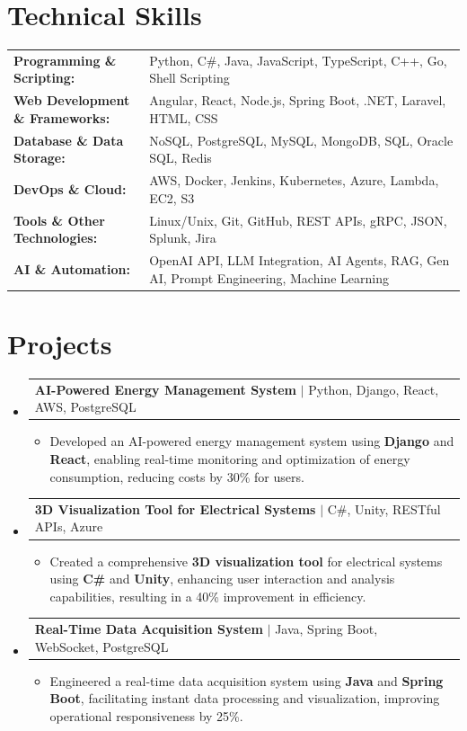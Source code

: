 \documentclass[letterpaper,10pt]{article}
\makeatletter
\newcommand{\resumeItem}[1]{
  \item{\fontsize{8pt}{9pt}\selectfont
    #1 \vspace{-3pt}
  }
}
\newcommand{\resumeProjectHeading}[2]{
    \item
    \begin{tabular*}{1.001\textwidth}{l@{\extracolsep{\fill}}r}
      \fontsize{8.5pt}{10pt}#1 & \textbf{\fontsize{8.5pt}{10pt} #2}\\
    \end{tabular*}\vspace{-7pt}
}
\newcommand{\resumeSubHeadingListStart}{\begin{itemize}[leftmargin=0pt, label={}]}
\newcommand{\resumeSubHeadingListEnd}{\end{itemize}}
\newcommand{\resumeItemListStart}{\begin{itemize}[leftmargin=*]}
\newcommand{\resumeItemListEnd}{\end{itemize}\vspace{-5pt}}
\makeatother
\begin{document}
\section{Technical Skills}
        \vspace{-14pt}
        \begin{table}[h]
            \fontsize{8pt}{9pt}\selectfont
            \begin{tabular}{p{0.3\linewidth} p{0.7\linewidth}}
                \textbf{Programming \& Scripting:} & Python, C\#, Java, JavaScript, TypeScript, C++, Go, Shell Scripting \\
                \textbf{Web Development \& Frameworks:} & Angular, React, Node.js, Spring Boot, .NET, Laravel, HTML, CSS \\
                \textbf{Database \& Data Storage:} & NoSQL, PostgreSQL, MySQL, MongoDB, SQL, Oracle SQL, Redis \\
                \textbf{DevOps \& Cloud:} & AWS, Docker, Jenkins, Kubernetes, Azure, Lambda, EC2, S3 \\
                \textbf{Tools \& Other Technologies:} & Linux/Unix, Git, GitHub, REST APIs, gRPC, JSON, Splunk, Jira \\
                \textbf{AI \& Automation:} & OpenAI API, LLM Integration, AI Agents, RAG, Gen AI, Prompt Engineering, Machine Learning \\
            \end{tabular}
        \end{table}
 \vspace{-18pt}

\section{Projects}
    \vspace{-5pt}
    \resumeSubHeadingListStart
          \resumeProjectHeading
            {\textbf{AI-Powered Energy Management System} $|$ Python, Django, React, AWS, PostgreSQL}{}
            \resumeItemListStart
                \resumeItem{Developed an AI-powered energy management system using \textbf{Django} and \textbf{React}, enabling real-time monitoring and optimization of energy consumption, reducing costs by 30\% for users.}
            \resumeItemListEnd
        \vspace{-12pt}
    
        \resumeProjectHeading
            {\textbf{3D Visualization Tool for Electrical Systems} $|$ C#, Unity, RESTful APIs, Azure}{}
        \resumeItemListStart
                \resumeItem{Created a comprehensive \textbf{3D visualization tool} for electrical systems using \textbf{C#} and \textbf{Unity}, enhancing user interaction and analysis capabilities, resulting in a 40\% improvement in efficiency.}
        \resumeItemListEnd
      \vspace{-12pt}
      \resumeProjectHeading
        {\textbf{Real-Time Data Acquisition System} $|$ Java, Spring Boot, WebSocket, PostgreSQL}{}
    \resumeItemListStart
            \resumeItem{Engineered a real-time data acquisition system using \textbf{Java} and \textbf{Spring Boot}, facilitating instant data processing and visualization, improving operational responsiveness by 25\%.}
    \resumeItemListEnd
    \resumeSubHeadingListEnd
\end{document}
